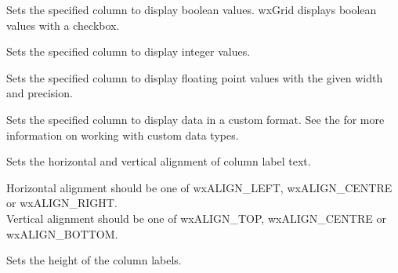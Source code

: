 {\label{wxgridsetcolformatbool}


Sets the specified column to display boolean values. wxGrid displays boolean values with a checkbox.

\label{wxgridsetcolformatnumber}


Sets the specified column to display integer values.

\label{wxgridsetcolformatfloat}


Sets the specified column to display floating point values with the given width and precision.

\label{wxgridsetcolformatcustom}


Sets the specified column to display data in a custom format.
See the  for more information on working
with custom data types.

\label{wxgridsetcollabelalignment}


Sets the horizontal and vertical alignment of column label text.

Horizontal alignment should be one of wxALIGN_LEFT, wxALIGN_CENTRE or wxALIGN_RIGHT. \\
Vertical alignment should be one of wxALIGN_TOP, wxALIGN_CENTRE or wxALIGN_BOTTOM.

\label{wxgridsetcollabelsize}


Sets the height of the column labels.

\label{wxgridsetcollabelvalue}


}
